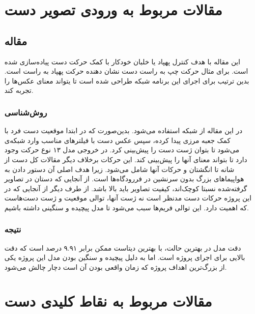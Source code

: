 \cite{hu2020deep}


\section{مقالات مربوط به ورودی تصویر دست}


\subsection{مقاله }
این مقاله با هدف کنترل پهپاد یا خلبان خودکار با کمک حرکت دست پیاده‌سازی شده است. برای مثال حرکت چپ به راست دست نشان دهنده حرکت پهپاد به راست است. بدین ترتیب برای اجرای این برنامه شبکه  طراحی شده است تا یتواند معنای عکس‌ها را تجربه کند.

\subsubsection{روش‌شناسی}
در این مقاله از شبکه‌‌  استفاده می‌شود. بدین‌صورت که در ابتدا موقعیت دست فرد با کمک جعبه مرزی  پیدا کرده، سپس عکس دست با فیلترهای مناسب وارد شبکه‌ی  می‌شود تا بتوان ژست دست را پیش‌بینی کرد. در خروجی مدل ۱۳ نوع حرکت وجود دارد تا بتواند معنای آنها را پیش‌بینی کند. این حرکات برخلاف دیگر مقالات کل دست از شانه تا انگشتان و حرکات آنها شامل می‌شود. زیرا هدف اصلی آن دستور دادن به هواپیما‌های
 بزرگ بدون سرنشین در فررودگاه‌ها است. از آنجایی که دستان در تصاویر گرفته‌شده نسبتا کوچک‌اند، کیفیت تصاویر باید بالا باشد. از طرف دیگر از آنجایی که در این پروژه حرکات دست مدنظر است نه ژست آنها، توالی موقعیت و ژست دست‌هاست که اهمیت دارد. این توالی فریم‌ها سبب می‌شود تا مدل پیچیده و سنگینی داشته باشیم.

\subsubsection{نتیجه}
دقت مدل در بهترین حالت، با بهترین دیتاست ممکن برابر ۹.۹۱ درصد است که دقت بالایی برای اجرای پروژه است. اما به دلیل پیچیده و سنگین بودن مدل این پروژه یکی از بزرگ‌ترین اهداف پروژه که زمان واقعی بودن آن است دچار چالش می‌شود.\cite{perera2018uav}




\section{مقالات مربوط به نقاط کلیدی دست}

